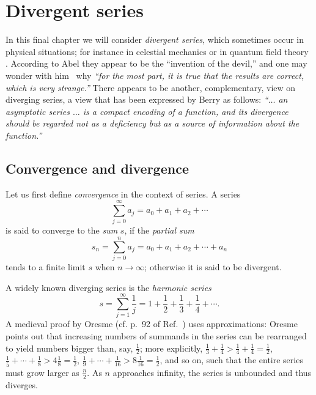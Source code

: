\chapter{Divergent series}

\label{2011-m-ch-ds}
In this final chapter we will consider {\em divergent series}, which sometimes occur
in physical situations;
for instance in celestial mechanics or in quantum field theory
\cite[-30mm]{Boyd99thedevil,PhysRev.85.631,PhysRevD.57.1144,PhysRevD.62.076001}.
According to Abel\cite{Hardy:1949,Boyd99thedevil} they
appear to be the ``invention of the devil,'' and one may wonder with him~\cite{rousseau-2004} why {\em ``for the most part,
it is true that the results are correct, which is very strange.''}
There appears to be another, complementary, view on diverging series,
a view that has been expressed by Berry as follows\cite{berry-92}:
{\em ``$\ldots$ an asymptotic series $\ldots$ is a compact encoding of a function,
and its divergence should be regarded not as a deficiency but as a source of information about the function.''
}

\section{Convergence and divergence}
Let us first define {\em convergence} in the context of series.
A series
\begin{equation}
\sum_{j=0}^\infty a_j =a_0+a_1+a_2+\cdots
\end{equation}
is said to converge to the {\em sum}
$s$, if the {\em partial sum}
\begin{equation}
s_n=  \sum_{j=0}^n a_j =a_0+a_1+a_2+\cdots + a_n
\end{equation}
tends to a finite limit $s$ when $n\rightarrow \infty$;
otherwise it is said to be divergent.

A widely known diverging series is the
{\em harmonic series}
\begin{equation}
s=  \sum_{j=1}^\infty \frac{1}{j} = 1+\frac{1}{2}+\frac{1}{3}+\frac{1}{4}+\cdots .
\end{equation}
A medieval proof by Oresme (cf. p.~92 of Ref.~\cite[10mm]{Edwards-1979})
uses approximations: Oresme points out that increasing numbers of summands in the series can be rearranged to yield numbers bigger than, say, $\frac{1}{2}$;
more explicitly,
$\frac{1}{3}+\frac{1}{4}> \frac{1}{4}+\frac{1}{4}  =\frac{1}{2}$,
$\frac{1}{5}+ \cdots +\frac{1}{8} > 4 \frac{1}{8}  =\frac{1}{2}$,
$\frac{1}{9}+ \cdots +\frac{1}{16} > 8 \frac{1}{16}  =\frac{1}{2}$,
and so on, such that the entire series must grow larger as $\frac{n}{2}$.
As $n$ approaches infinity, the series is unbounded and thus diverges.


